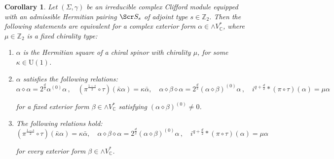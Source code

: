 \documentclass[10pt,a4paper,twoside,reqno]{amsart}
\theoremstyle{plain}
\newtheorem{cor}[thm]{Corollary}
\theoremstyle{definition}
\theoremstyle{remark}
\def\C{\mathbb{C}}
\def\scS{\Scr S}
\def\U{\mathrm{U}}
\begin{document}
\begin{cor}
\label{cor:sq_S_chiral}
Let $(\Sigma,\gamma)$ be an irreducible complex Clifford module equipped with an admissible Hermitian pairing $\scS_s$ of adjoint type $s \in \mathbb{Z}_2$. Then the following statements are equivalent for a complex exterior form $\alpha\in\wedge V^*_\C$, where $\mu\in\mathbb{Z}_2$ is a fixed chirality type: 
\begin{enumerate}
\item[\normalfont(a)] $\alpha$ is the Hermitian square of a chiral spinor with chirality $\mu$, for some $\kappa\in\U(1)$.
\item[\normalfont(b)] $\alpha$ satisfies the following relations: 
\begin{equation*}
\alpha\diamond\alpha=2^{\frac{d}{2}}\alpha^{(0)}\alpha\, , \quad (\pi^{\frac{1-s}{2}}\circ\tau)(\bar\kappa\alpha)=  \kappa \bar{\alpha} , \quad \alpha \diamond \beta \diamond\alpha=2^{\frac{d}{2}}(\alpha\diamond\beta)^{(0)}\alpha\, ,\quad i^{q+\frac{d}{2}} \ast (\pi\circ\tau)(\alpha)=\mu\alpha
\end{equation*}

\noindent
for a fixed exterior form $\beta\in\wedge V^*_\C$ satisfying $(\alpha \diamond \beta)^{(0)} \neq 0$.
\item[\normalfont(c)] The following relations hold: 
\begin{equation*}
(\pi^{\frac{1-s}{2}}\circ\tau)(\bar\kappa\alpha)=  \kappa \bar{\alpha} , \quad \alpha \diamond \beta \diamond\alpha=2^{\frac{d}{2}}(\alpha\diamond\beta)^{(0)}\alpha\, ,\quad i^{q+\frac{d}{2}} \ast (\pi\circ\tau)(\alpha)=\mu\alpha
\end{equation*}

\noindent
for every exterior form $\beta\in\wedge V^*_\C$.
\end{enumerate}
\end{cor}
\end{document}
